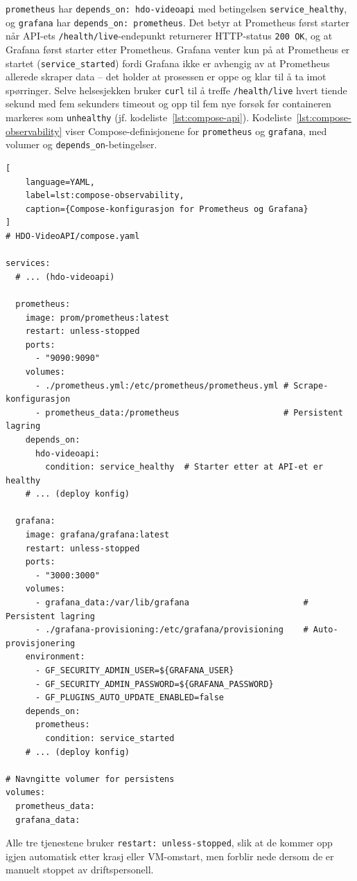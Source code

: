 \texttt{prometheus} har \texttt{depends\_on: hdo-videoapi} med betingelsen \texttt{service\_healthy}, og \texttt{grafana} har \texttt{depends\_on: prometheus}. Det betyr at Prometheus først starter når API-ets \texttt{/health/live}-endepunkt returnerer HTTP-status \texttt{200 OK}, og at Grafana først starter etter Prometheus. Grafana venter kun på at Prometheus er startet (\texttt{service\_started}) fordi Grafana ikke er avhengig av at Prometheus allerede skraper data -- det holder at prosessen er oppe og klar til å ta imot spørringer. Selve helsesjekken bruker \texttt{curl} til å treffe \texttt{/health/live} hvert tiende sekund med fem sekunders timeout og opp til fem nye forsøk før containeren markeres som \texttt{unhealthy} (jf. kodeliste~\ref{lst:compose-api}). Kodeliste~\ref{lst:compose-observability} viser Compose-definisjonene for \texttt{prometheus} og \texttt{grafana}, med volumer og \texttt{depends\_on}-betingelser.

\begin{lstlisting}[
    language=YAML,
    label=lst:compose-observability,
    caption={Compose-konfigurasjon for Prometheus og Grafana}
]
# HDO-VideoAPI/compose.yaml

services:
  # ... (hdo-videoapi)
    
  prometheus:
    image: prom/prometheus:latest
    restart: unless-stopped
    ports:
      - "9090:9090"
    volumes:
      - ./prometheus.yml:/etc/prometheus/prometheus.yml # Scrape-konfigurasjon
      - prometheus_data:/prometheus                     # Persistent lagring
    depends_on:
      hdo-videoapi:
        condition: service_healthy  # Starter etter at API-et er healthy
    # ... (deploy konfig)

  grafana:
    image: grafana/grafana:latest
    restart: unless-stopped
    ports:
      - "3000:3000"
    volumes:
      - grafana_data:/var/lib/grafana                       # Persistent lagring
      - ./grafana-provisioning:/etc/grafana/provisioning    # Auto-provisjonering
    environment:
      - GF_SECURITY_ADMIN_USER=${GRAFANA_USER}
      - GF_SECURITY_ADMIN_PASSWORD=${GRAFANA_PASSWORD}
      - GF_PLUGINS_AUTO_UPDATE_ENABLED=false
    depends_on:
      prometheus:
        condition: service_started
    # ... (deploy konfig)

# Navngitte volumer for persistens
volumes:
  prometheus_data:
  grafana_data:
\end{lstlisting}

Alle tre tjenestene bruker \texttt{restart: unless-stopped}, slik at de kommer opp igjen automatisk etter krasj eller VM-omstart, men forblir nede dersom de er manuelt stoppet av driftspersonell.

